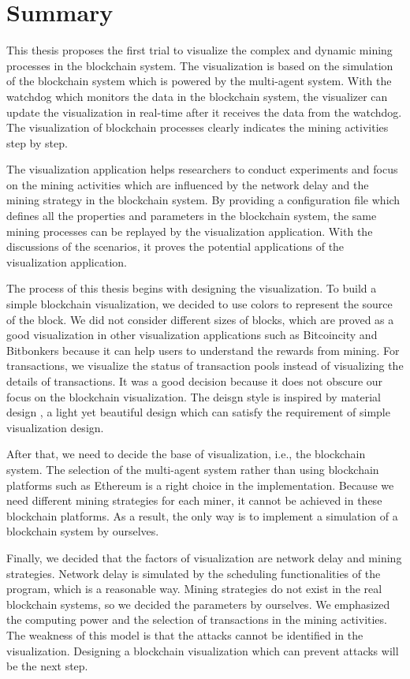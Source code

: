\section{Summary}

This thesis proposes the first trial to visualize the complex and dynamic mining processes in the blockchain system. The visualization is based on the simulation of the blockchain system which is powered by the multi-agent system. With the watchdog which monitors the data in the blockchain system, the visualizer can update the visualization in real-time after it receives the data from the watchdog. The visualization of blockchain processes clearly indicates the mining activities step by step. 

The visualization application helps researchers to conduct experiments and focus on the mining activities which are influenced by the network delay and the mining strategy in the blockchain system. By providing a configuration file which defines all the properties and parameters in the blockchain system, the same mining processes can be replayed by the visualization application. With the discussions of the scenarios, it proves the potential applications of the visualization application.

The process of this thesis begins with designing the visualization. To build a simple blockchain visualization, we decided to use colors to represent the source of the block. We did not consider different sizes of blocks, which are proved as a good visualization in other visualization applications such as Bitcoincity and Bitbonkers because it can help users to understand the rewards from mining. For transactions, we visualize the status of transaction pools instead of visualizing the details of transactions. It was a good decision because it does not obscure our focus on the blockchain visualization. The deisgn style is inspired by material design \cite{material}, a light yet beautiful design which can satisfy the requirement of simple visualization design.

After that, we need to decide the base of visualization, i.e., the blockchain system. The selection of the multi-agent system rather than using blockchain platforms such as Ethereum is a right choice in the implementation. Because we need different mining strategies for each miner, it cannot be achieved in these blockchain platforms. As a result, the only way is to implement a simulation of a blockchain system by ourselves.

Finally, we decided that the factors of visualization are network delay and mining strategies. Network delay is simulated by the scheduling functionalities of the program, which is a reasonable way. Mining strategies do not exist in the real blockchain systems, so we decided the parameters by ourselves. We emphasized the computing power and the selection of transactions in the mining activities. The weakness of this model is that the attacks cannot be identified in the visualization. Designing a blockchain visualization which can prevent attacks will be the next step.


